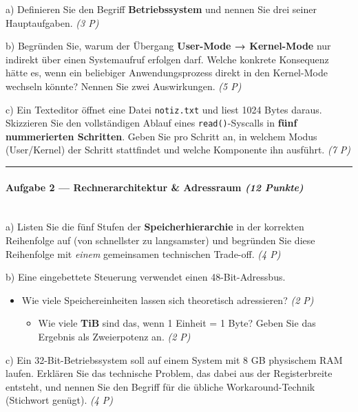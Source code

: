 \documentclass[11pt, a4paper]{article}
\begin{document}
a) Definieren Sie den Begriff \textbf{Betriebssystem} und nennen Sie drei seiner Hauptaufgaben. \textit{(3 P)}


b) Begründen Sie, warum der Übergang \textbf{User-Mode → Kernel-Mode} nur indirekt über einen Systemaufruf erfolgen darf. Welche konkrete Konsequenz hätte es, wenn ein beliebiger Anwendungsprozess direkt in den Kernel-Mode wechseln könnte? Nennen Sie zwei Auswirkungen. \textit{(5 P)}


c) Ein Texteditor öffnet eine Datei \texttt{notiz.txt} und liest 1024 Bytes daraus. Skizzieren Sie den vollständigen Ablauf eines \texttt{read()}-Syscalls in \textbf{fünf nummerierten Schritten}. Geben Sie pro Schritt an, in welchem Modus (User/Kernel) der Schritt stattfindet und welche Komponente ihn ausführt. \textit{(7 P)}



\noindent\textcolor{rulegray}{\rule{\linewidth}{0.4pt}}


\paragraph{Aufgabe 2 — Rechnerarchitektur \& Adressraum \textit{(12 Punkte)}}\mbox{}\\[2pt]

a) Listen Sie die fünf Stufen der \textbf{Speicherhierarchie} in der korrekten Reihenfolge auf (von schnellster zu langsamster) und begründen Sie diese Reihenfolge mit \textit{einem} gemeinsamen technischen Trade-off. \textit{(4 P)}


b) Eine eingebettete Steuerung verwendet einen 48-Bit-Adressbus.

\begin{itemize}
  \item Wie viele Speichereinheiten lassen sich theoretisch adressieren? \textit{(2 P)}
\begin{itemize}
  \item Wie viele \textbf{TiB} sind das, wenn 1 Einheit = 1 Byte? Geben Sie das Ergebnis als Zweierpotenz an. \textit{(2 P)}
\end{itemize}
\end{itemize}

c) Ein 32-Bit-Betriebssystem soll auf einem System mit 8 GB physischem RAM laufen. Erklären Sie das technische Problem, das dabei aus der Registerbreite entsteht, und nennen Sie den Begriff für die übliche Workaround-Technik (Stichwort genügt). \textit{(4 P)}
\end{document}
